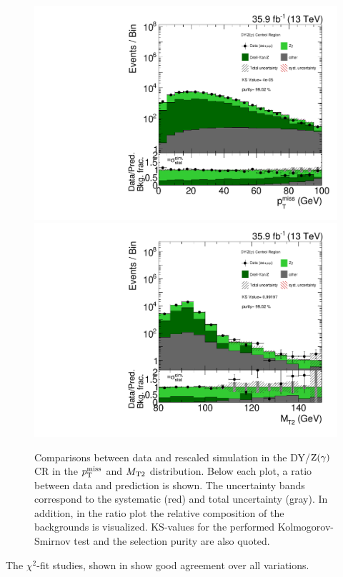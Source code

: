 \begin{figure}[tbp]
 \centering
 \includegraphics[width=\pairwidth]{figures/plots_CR_dy/CRDY_LL_nom_met_log}
 \includegraphics[width=\pairwidth]{figures/plots_CR_dy/CRDY_LL_nom_mt2_log}
 \caption{Comparisons between data and rescaled simulation in the DY/$\mathrm{Z}(\gamma)$ CR in the $p_{\mathrm{T}}^\text{miss}$ and $M_{\mathrm{T2}}$ distribution. Below each plot, a ratio between data and prediction is shown. The uncertainty bands correspond to the systematic (red) and total uncertainty (gray). In addition, in the ratio plot the relative composition of the backgrounds is visualized. KS-values for the performed Kolmogorov-Smirnov test and the selection purity are also quoted.}
 \label{fig:CRDY}
\end{figure}
The $\chi^2$-fit studies, shown in  show good agreement over all variations.

